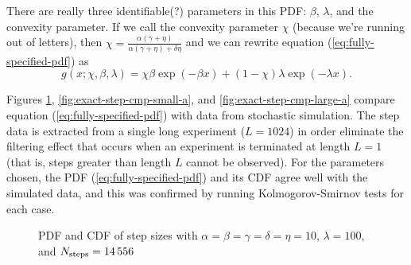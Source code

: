 \documentclass{article}
\newcommand{\tn}{\textnormal}
\begin{document}
There are really three identifiable(?) parameters in this PDF:
$\beta$, $\lambda$, and the convexity parameter. If we call the
convexity parameter $\chi$ (because we're running out of letters),
then
$\chi = \frac{\alpha (\gamma + \eta)}{\alpha (\gamma + \eta) +
  \delta\eta}$ and we can rewrite equation
(\ref{eq:fully-specified-pdf}) as
\begin{equation}
  \label{eq:pdf-three-par}
  g(x; \chi, \beta, \lambda) = \chi \beta \exp(-\beta x) + (1 - \chi)
  \lambda \exp(-\lambda x).
\end{equation}

Figures \ref{fig:exact-step-cmp-equal-rates},
\ref{fig:exact-step-cmp-small-a}, and \ref{fig:exact-step-cmp-large-a}
compare equation (\ref{eq:fully-specified-pdf}) with data from
stochastic simulation. The step data is extracted from a single long
experiment ($L = 1024$) in order eliminate the filtering effect that
occurs when an experiment is terminated at length $L = 1$ (that is,
steps greater than length $L$ cannot be observed). For the parameters
chosen, the PDF (\ref{eq:fully-specified-pdf}) and its CDF agree well
with the simulated data, and this was confirmed by running
Kolmogorov-Smirnov tests for each case.

\begin{figure}
  \centering
  \begin{subfigure}{0.48\textwidth}
  \end{subfigure}
  \hfill
  \begin{subfigure}{0.48\textwidth}
  \end{subfigure}
  \caption{PDF and CDF of step sizes with $\alpha = \beta = \gamma =
    \delta = \eta = 10$, $\lambda = 100$, and $N_\tn{steps} =
    14\,556$}
  \label{fig:exact-step-cmp-equal-rates}
\end{figure}
\end{document}
